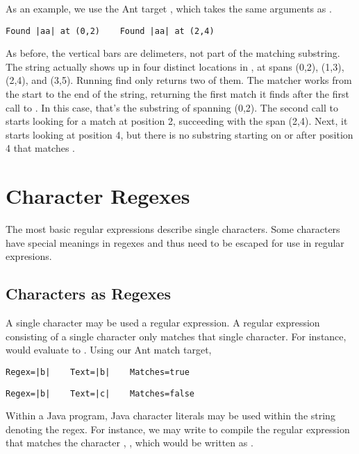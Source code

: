 As an example, we use the Ant target , which takes
the same arguments as .
%
%
\begin{verbatim}
Found |aa| at (0,2)    Found |aa| at (2,4)
\end{verbatim}
%
As before, the vertical bars are delimeters, not part of the matching
substring.  The string  actually shows up in four
distinct locations in , at spans (0,2), (1,3),
(2,4), and (3,5).  Running find only returns two of them.  The matcher
works from the start to the end of the string, returning the first
match it finds after the first call to .  In this case,
that's the substring of  spanning (0,2).  The
second call to  starts looking for a match at position 2,
succeeding with the span (2,4).  Next, it starts looking at position
4, but there is no substring starting on or after position 4 that
matches .


\section{Character Regexes}

The most basic regular expressions describe single characters.  Some
characters have special meanings in regexes and thus need to be
escaped for use in regular expresions.

\subsection{Characters as Regexes}

A single character may be used a regular expression.  A regular
expression consisting of a single character only matches that single
character.  For instance,
 would evaluate to
.  Using our Ant match target, 
%
\begin{verbatim}
Regex=|b|    Text=|b|    Matches=true
\end{verbatim}
%
\begin{verbatim}
Regex=|b|    Text=|c|    Matches=false
\end{verbatim}
%
Within a Java program, Java character literals may be used within the
string denoting the regex.  For instance, we may write
 to compile the regular expression
that matches the character , , which would be written as .

